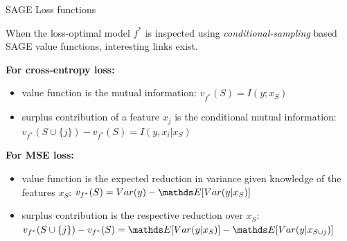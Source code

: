 \documentclass[11pt,compress,t,notes=noshow, aspectratio=169, xcolor=table]{beamer}
\begin{document}
\begin{frame}{SAGE Loss functions}

When the loss-optimal model $f^*$ is inspected using \textit{conditional-sampling} based SAGE value functions, interesting links exist.

\lz\pause
\textbf{For cross-entropy loss:} 
  \begin{itemize}
      \item value function is the mutual information:  $v_{f^*}(S) = I(y;x_S)$
      \item surplus contribution of a feature $x_j$ is the conditional mutual information: $v_{f^*}(S \cup \{j\}) - v_{f^*}(S) = I(y,x_i|x_S)$
  \end{itemize}

\lz\pause

\textbf{For MSE loss:} 
    \begin{itemize}
    \item value function is the expected reduction in variance given knowledge of the features $x_S$: $v_{f^*}(S) = Var(y) - \E[Var(y|x_S)]$
    \item surplus contribution is the respective reduction over $x_S$:
    $v_{f^*}(S \cup \{j\}) - v_{f^*}(S) = \E[Var(y|x_S)] - \E[Var(y|x_{S \cup {j}})]$
    \end{itemize}
    
\end{frame}
\end{document}
